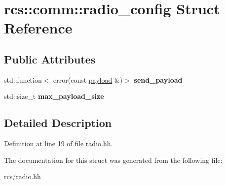 \hypertarget{structrcs_1_1comm_1_1radio__config}{}\section{rcs\+:\+:comm\+:\+:radio\+\_\+config Struct Reference}
\label{structrcs_1_1comm_1_1radio__config}
\subsection*{Public Attributes}
\begin{DoxyCompactItemize}
\item 
\mbox{\label{structrcs_1_1comm_1_1radio__config_acc1858df49497ac1a7fcc8b524be7844}} 
std\+::function$<$ error(const \mbox{\hyperlink{structrcs_1_1comm_1_1payload}{payload}} \&)$>$ {\bfseries send\+\_\+payload}
\item 
\mbox{\label{structrcs_1_1comm_1_1radio__config_a5bac8de265cb4074531b2ab66d55ece7}} 
std\+::size\+\_\+t {\bfseries max\+\_\+payload\+\_\+size}
\end{DoxyCompactItemize}


\subsection{Detailed Description}


Definition at line 19 of file radio.\+hh.



The documentation for this struct was generated from the following file\+:\begin{DoxyCompactItemize}
\item 
rcs/radio.\+hh\end{DoxyCompactItemize}
